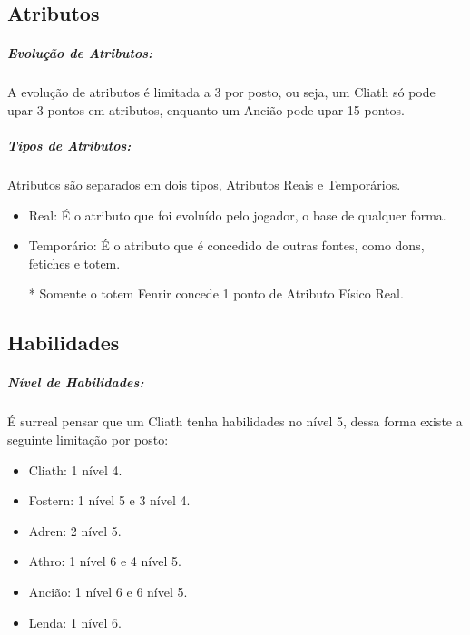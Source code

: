 \subsection{\bf Atributos}

\subparagraph{\bf Evolução de Atributos:}
A evolução de atributos é limitada a 3 por posto, ou seja, um Cliath só pode upar 3 pontos em atributos, enquanto um Ancião pode upar 15 pontos.

\subparagraph{\bf Tipos de Atributos:}
Atributos são separados em dois tipos, Atributos Reais e Temporários.
\begin{itemize}[noitemsep]
    \item Real: É o atributo que foi evoluído pelo jogador, o base de qualquer forma.
    \item Temporário: É o atributo que é concedido de outras fontes, como dons, fetiches e totem.
    \item[*] Somente o totem Fenrir concede 1 ponto de Atributo Físico Real.
\end{itemize}

\subsection{\bf Habilidades}

\subparagraph{\bf Nível de Habilidades:}
É surreal pensar que um Cliath tenha habilidades no nível 5, dessa forma existe a seguinte limitação por posto:

\begin{itemize}[noitemsep]
    \item Cliath: 1 nível 4.
    \item Fostern: 1 nível 5 e 3 nível 4.
    \item Adren: 2 nível 5.
    \item Athro: 1 nível 6 e 4 nível 5.
    \item Ancião: 1 nível 6 e 6 nível 5.
    \item Lenda:  1 nível 6.
\end{itemize}